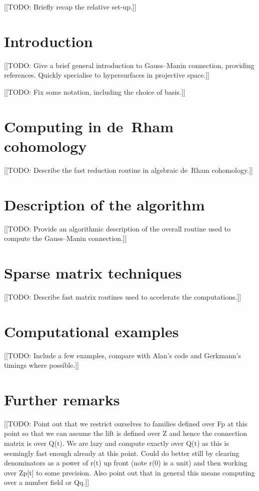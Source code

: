 
[[TODO:  Briefly recap the relative set-up.]]

\section{Introduction}

[[TODO:  Give a brief general introduction to Gauss--Manin connection, 
providing references.  Quickly specialise to hypersurfaces in projective 
space.]]

[[TODO:  Fix some notation, including the choice of basis.]]

\section{Computing in de~{R}ham cohomology}

[[TODO:  Describe the fast reduction routine in algebraic 
de~Rham cohomology.]]

\section{Description of the algorithm}

[[TODO:  Provide an algorithmic description of the overall routine 
used to compute the Gauss--Manin connection.]]

\section{Sparse matrix techniques}

[[TODO:  Describe fast matrix routines used to accelerate the 
computations.]]

\section{Computational examples}

[[TODO:  Include a few examples, compare with Alan's code and 
Gerkmann's timings where possible.]]

\section{Further remarks}

[[TODO:  Point out that we restrict ourselves to families defined 
over Fp at this point so that we can assume the lift is defined 
over Z and hence the connection matrix is over Q(t).  We are lazy 
and compute exactly over Q(t) as this is seemingly fast enough 
already at this point.  Could do better still by clearing denominators 
as a power of r(t) up front (note r(0) is a unit) and then working 
over Zp[t] to some precision.  Also point out that in general this 
means computing over a number field or Qq.]]


